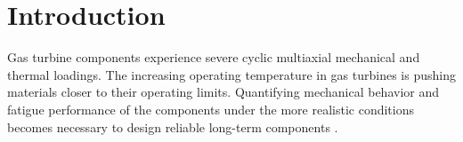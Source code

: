 



\section{Introduction}
\noindent
Gas turbine components experience severe cyclic multiaxial mechanical and thermal loadings. The increasing operating temperature in gas turbines is pushing materials closer to their operating limits. Quantifying mechanical behavior and fatigue performance of the components under the more realistic conditions becomes necessary to design reliable long-term components \cite{Harrison1996}.

